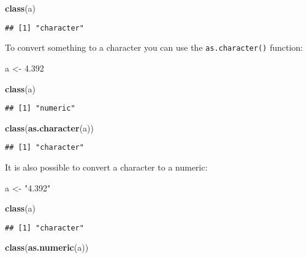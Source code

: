 \documentclass[
]{article}
\newenvironment{Shaded}{\begin{snugshade}}{\end{snugshade}}
\newcommand{\FloatTok}[1]{\textcolor[rgb]{0.00,0.00,0.81}{#1}}
\newcommand{\KeywordTok}[1]{\textcolor[rgb]{0.13,0.29,0.53}{\textbf{#1}}}
\newcommand{\NormalTok}[1]{#1}
\newcommand{\StringTok}[1]{\textcolor[rgb]{0.31,0.60,0.02}{#1}}
\begin{document}
\begin{Shaded}
\begin{Highlighting}[]
\KeywordTok{class}\NormalTok{(a)}
\end{Highlighting}
\end{Shaded}

\begin{verbatim}
## [1] "character"
\end{verbatim}

To convert something to a character you can use the \texttt{as.character()} function:

\begin{Shaded}
\begin{Highlighting}[]
\NormalTok{a \textless{}{-}}\StringTok{ }\FloatTok{4.392}

\KeywordTok{class}\NormalTok{(a)}
\end{Highlighting}
\end{Shaded}

\begin{verbatim}
## [1] "numeric"
\end{verbatim}

\begin{Shaded}
\begin{Highlighting}[]
\KeywordTok{class}\NormalTok{(}\KeywordTok{as.character}\NormalTok{(a))}
\end{Highlighting}
\end{Shaded}

\begin{verbatim}
## [1] "character"
\end{verbatim}

It is also possible to convert a character to a numeric:

\begin{Shaded}
\begin{Highlighting}[]
\NormalTok{a \textless{}{-}}\StringTok{ "4.392"}

\KeywordTok{class}\NormalTok{(a)}
\end{Highlighting}
\end{Shaded}

\begin{verbatim}
## [1] "character"
\end{verbatim}

\begin{Shaded}
\begin{Highlighting}[]
\KeywordTok{class}\NormalTok{(}\KeywordTok{as.numeric}\NormalTok{(a))}
\end{Highlighting}
\end{Shaded}
\end{document}
